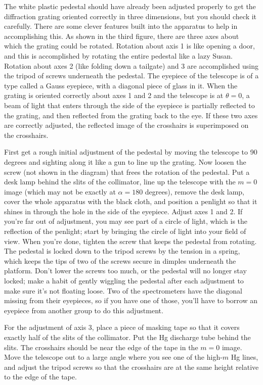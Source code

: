 The white plastic pedestal should have already been adjusted
properly to get the diffraction grating oriented correctly
in three dimensions, but you should check it carefully.
There are some clever features built into the apparatus to help in
accomplishing this. As shown in the third figure, there are three
axes about which the grating could be rotated. Rotation about axis 1 is
like opening a door, and this is accomplished by rotating the entire pedestal like a lazy Susan. Rotation about
axes 2 (like folding down a tailgate) and 3 are accomplished using the
tripod of screws underneath the pedestal. 
The eyepiece of the telescope is of a type called a Gauss eyepiece, with a diagonal piece of
glass in it.  When the grating is oriented correctly about axes 1 and 2 and the telescope
is at $\theta=0$, a beam
of light that enters through the side of the eyepiece is partially reflected to
the grating, and then reflected from the grating back to the eye. If these two axes
are correctly adjusted, the reflected image of the crosshairs is superimposed on the
crosshairs.

First get a rough initial adjustment of the pedestal by moving the telescope to 90 degrees
and sighting along it like a gun to line up the grating.
Now loosen the screw (not shown in the diagram) that frees the rotation of the pedestal.
Put a desk lamp behind the slits of the collimator, line up the telescope with
the $m=0$ image (which may not be exactly at $\alpha=180$ degrees), remove the desk
lamp, cover the whole apparatus with the black cloth, and position a penlight
so that it shines in through the hole in the side of the eyepiece. Adjust axes
1 and 2. If you're far out of adjustment, you may see part of a circle of light,
which is the reflection of the penlight; start by bringing the circle of light
into your field of view. When you're done, tighten the screw that keeps the pedestal
from rotating. The pedestal is locked down to the tripod screws by the tension in
a spring, which keeps the tips of two of the screws secure in dimples underneath the
platform. Don't lower the screws too much, or the pedestal will no longer
stay locked; make a habit of gently wiggling the pedestal after each adjustment
to make sure it's not floating loose. Two of the spectrometers have the diagonal
missing from their eyepieces, so if you have one of those, you'll have to borrow
an eyepiece from another group to do this adjustment.

For the adjustment of axis 3, place a piece of masking tape so that it covers exactly
half of the slits of the collimator. Put the Hg discharge tube behind the slits.
The crosshairs should be near the edge of the tape in the $m=0$ image. Move the telescope out to
a large angle where you see one of the high-$m$ Hg lines, and adjust the tripod screws
so that the crosshairs are at the same height relative to the edge of the tape.


